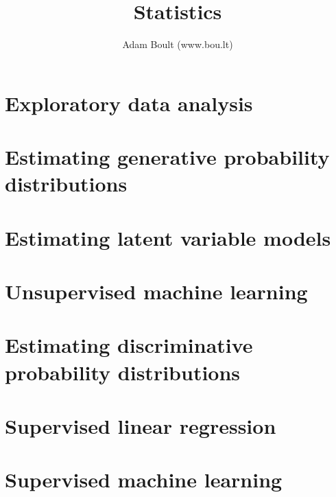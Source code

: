 \documentclass[oneside]{book}
\begin{document}
\author{Adam Boult (www.bou.lt)}
\title{Statistics}
\maketitle

\setcounter{tocdepth}{0}
\tableofcontents



\part{Exploratory data analysis}







\part{Estimating generative probability distributions}












\part{Estimating latent variable models}


\part{Unsupervised machine learning}



\part{Estimating discriminative probability distributions}





\part{Supervised linear regression}






\part{Supervised machine learning}

















\end{document}
